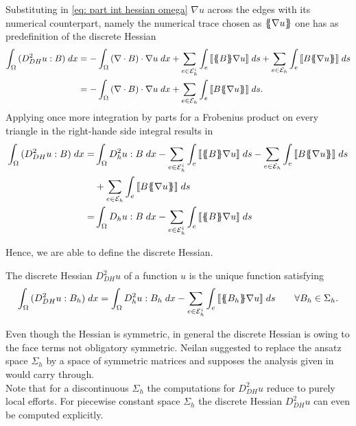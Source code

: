 Substituting in \eqref{eq: part int hessian omega} $\nabla u$ across the edges with its numerical counterpart, namely the numerical trace chosen as $\{\!\!\{ \nabla u \}\!\!\}$ one has as predefinition of the discrete Hessian
	\begin{align}
		\myIntX  \Omega { (D_{DH}^2 u : B) }
		&= - \myIntX  \Omega { \left(\nabla \cdot B\right) \cdot \nabla u}
		+ \sum_{ e \in \edgesi} \myIntS e {  \jump {\average B \nabla u } }
				+ \sum_{ e \in \edges} \myIntS e { \jump {B \average {\nabla u} }}  \nonumber \\
		&= - \myIntX  \Omega { \left(\nabla \cdot B\right) \cdot \nabla u}
				+ \sum_{ e \in \edges} \myIntS e {  \jump{B \average {\nabla u} }}.	
	\end{align}
Applying once more integration by parts for a Frobenius product on every triangle in the right-hande side integral results in
	\begin{align}
		\myIntX  \Omega { (D_{DH}^2 u : B) }
		=& \myIntX  \Omega { D^2_h u: B }
			-\sum_{ e \in \edgesi} \myIntS e {  \jump {\average B  \nabla u }}
			- \sum_{ e \in \edges} \myIntS e { \jump {B \average {\nabla u} }}\nonumber \\		
			&+ \sum_{ e \in \edges} \myIntS e {  \jump {B \average {\nabla u} }}		\nonumber \\
		=& \myIntX  \Omega { D_h u: B}
			 -\sum_{ e \in \edgesi} \myIntS e {  \jump {\average B  \nabla u }	}
	\end{align}

Hence, we are able to define the discrete Hessian.
\begin{definition} \label{def: discrete Hessian}
	The discrete Hessian $D_{DH}^2 u$ of a function $u$ is the unique function satisfying
	\begin{align}
		\int_{\Omega} {{ (D_{DH}^2 u : B_h) }\;dx}
		= \int_{\Omega} {{ D^2_h u: B_h}\;dx}
			 -\sum_{ e \in \mathcal{E}_h^i} \int_{e} {{  \llbracket \{\!\!\{ B_h \}\!\!\} \nabla u  \rrbracket}\;ds}\qquad \forall B_h \in \Sigma_h. \label{eq: discrete hessian}
	\end{align}
\end{definition}

Even though the Hessian is symmetric, in general the discrete Hessian is owing to the face terms not obligatory symmetric. Neilan suggested to replace the ansatz space $\Sigma_h$ by a space of symmetric matrices and supposes the analysis given in \cite{Neilan2014} would carry through.\\
Note that for a discontinuous $\Sigma_h$ the computations for $D_{DH}^2 u$ reduce to purely local efforts. For piecewise constant space $\Sigma_h$ the discrete Hessian $D_{DH}^2 u$ can even be computed explicitly.

